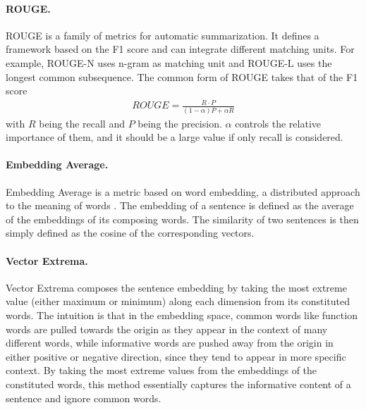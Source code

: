 \documentclass[runningheads]{llncs}
\begin{document}
    \paragraph{ROUGE.}
    ROUGE \cite{ROUGE} is a family of metrics for automatic summarization. It defines a framework based on the F1 score and can integrate different matching units. For example, ROUGE-N uses n-gram as matching unit and ROUGE-L uses the longest common subsequence. The common form of ROUGE takes that of the F1 score
    \begin{align}
        \textit{ROUGE} = \frac{
        R \cdot P
        }{(1 - \alpha) P + \alpha R}
    \end{align}
    with $R$ being the recall and $P$ being the precision. $\alpha$ controls the relative importance of them, and it should be a large value if only recall is considered.

    \paragraph{Embedding Average.}
    Embedding Average is a metric based on word embedding, a distributed approach to the meaning of words \cite{word2vec}. The embedding of a sentence is defined as the average of the embeddings of its composing words. The similarity of two sentences is then simply defined as the cosine of the corresponding vectors.

    \paragraph{Vector Extrema.}
    Vector Extrema \cite{Vector_Extrema} composes the sentence embedding by taking the most extreme value (either maximum or minimum) along each dimension from its constituted words. The intuition is that in the embedding space, common words like function words are pulled towards the origin as they appear in the context of many different words, while informative words are pushed away from the origin in either positive or negative direction, since they tend to appear in more specific context. By taking the most extreme values from the embeddings of the constituted words, this method essentially captures the informative content of a sentence and ignore common words.
\end{document}

